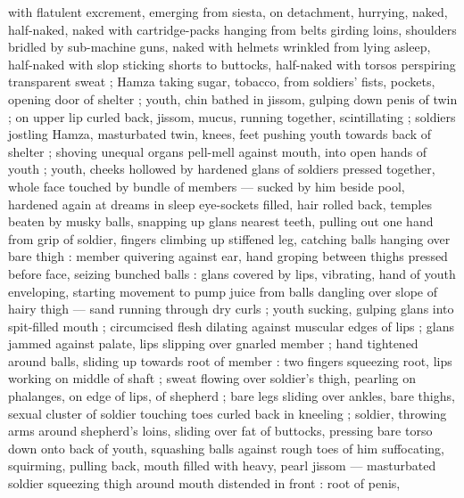 with flatulent excrement, emerging from siesta, on detachment, hurrying, naked, half-naked, naked with cartridge-packs hanging from belts girding loins, shoulders bridled by sub-machine guns, naked with helmets wrinkled from lying asleep, half-naked with slop sticking shorts to buttocks, half-naked with torsos perspiring transparent sweat ; Hamza taking sugar, tobacco, from soldiers' fists, pockets, opening door of shelter ; youth, chin bathed in jissom, gulping down penis of twin ; on upper lip curled back, jissom, mucus, running together, scintillating ; soldiers jostling Hamza, masturbated twin, knees, feet pushing youth towards back of shelter ; shoving unequal organs pell-mell against mouth, into open hands of youth ; youth, cheeks hollowed by hardened glans of soldiers pressed together, whole face touched by bundle of members --- sucked by him beside pool, hardened again at dreams in sleep {\dashcom} eye-sockets filled, hair rolled back, temples beaten by musky balls, snapping up glans nearest teeth, pulling out one hand from grip of soldier, fingers climbing up stiffened leg, catching balls hanging over bare thigh : member quivering against ear, hand groping between thighs pressed before face, seizing bunched balls : glans covered by lips, vibrating, hand of youth enveloping, starting movement to pump juice from balls dangling over slope of hairy thigh --- sand running through dry curls ; youth sucking, gulping glans into spit-filled mouth ; circumcised flesh dilating against muscular edges of lips ; glans jammed against palate, lips slipping over gnarled member ; hand tightened around balls, sliding up towards root of member : two fingers squeezing root, lips working on middle of shaft ; sweat flowing over soldier's thigh, pearling on phalanges, on edge of lips, of shepherd ; bare legs sliding over ankles, bare thighs, sexual cluster of soldier touching toes curled back in kneeling ; soldier, throwing arms around shepherd's loins, sliding over fat of buttocks, pressing bare torso down onto back of youth, squashing balls against rough toes of him suffocating, squirming, pulling back, mouth filled with heavy, pearl jissom --- masturbated soldier squeezing thigh around mouth distended in front : root of penis, 
